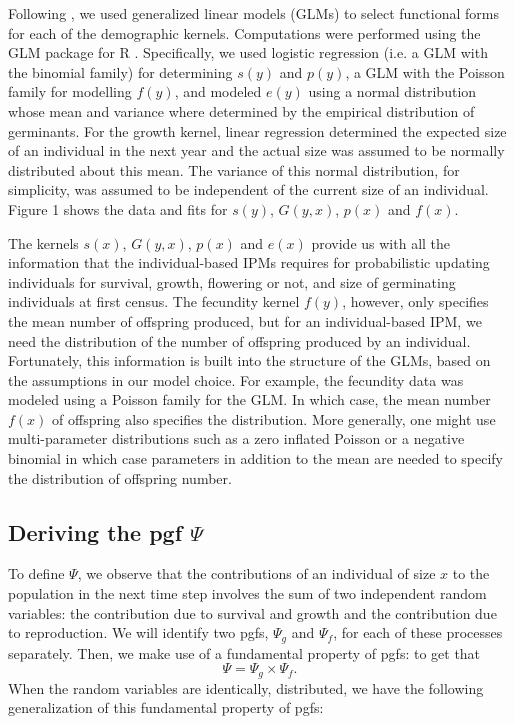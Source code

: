 \documentclass[12pt]{amsart}\usepackage[]{graphicx}\usepackage[]{color}
\begin{document}
Following \citet{nicole-etal-11}, we used generalized linear models (GLMs) to select functional forms for each of the demographic kernels. Computations were performed using the GLM package for R \citep{R-15}. Specifically, we used logistic regression (i.e. a GLM with the binomial family) for determining $s(y)$ and $p(y)$, a GLM with the Poisson family for modelling $f(y)$, and modeled $e(y)$ using a normal distribution whose mean and variance where determined by the empirical distribution of germinants. For the growth kernel, linear regression determined the expected size of an individual in the next year and the actual size was assumed to be normally distributed about this mean. The variance of this normal distribution, for simplicity, was assumed to be independent of the current size of an individual. Figure 1 shows the data and fits for $s(y)$, $G(y,x)$, $p(x)$ and $f(x)$.





The kernels $s(x)$, $G(y,x)$, $p(x)$ and $e(x)$ provide us with all the information that the individual-based IPMs requires for probabilistic updating individuals for survival, growth, flowering or not, and size of germinating individuals at first census. The fecundity kernel $f(y)$, however, only specifies the mean number of offspring produced, but for an individual-based IPM, we need the distribution of the number of offspring produced by an individual. Fortunately, this information is built into the structure of the GLMs, based on the assumptions in our model choice. For example, the fecundity data was modeled using a Poisson family for the GLM.  In which case, the mean number $f(x)$ of offspring also specifies the distribution. More generally, one might use multi-parameter distributions such as a zero inflated Poisson or a negative binomial in which case parameters in addition to the mean are needed to specify the distribution of offspring number.

\subsection*{Deriving the pgf $\Psi$}

To define $\Psi$, we observe that the contributions of an individual of size $x$ to the population in the next time step involves the sum of two independent random variables:  the contribution due to survival and growth and the contribution due to reproduction. We will identify two pgfs, $\Psi_g$ and $\Psi_f$, for each of these processes separately. Then, we make use of a fundamental property of pgfs:\vskip 0.1in
\vskip 0.1in
to get that
\[
\Psi=\Psi_g \times \Psi_f.
\]
When the random variables are identically, distributed, we have the following generalization of this fundamental property of pgfs:
\vskip 0.1in
\vskip 0.1in
\end{document}
